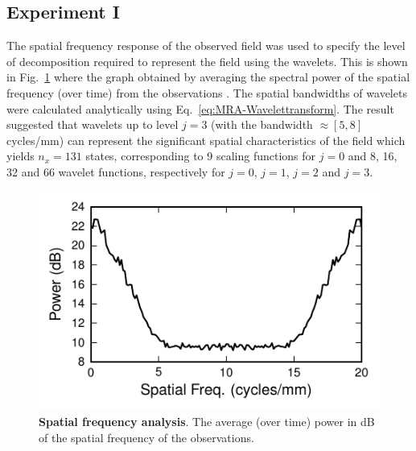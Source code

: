 \documentclass[review,authoryear,3p]{elsarticle}
\begin{document}
\subsection{Experiment I}
The spatial frequency response of the observed field was used to specify the level of decomposition required to represent the field using the wavelets. This is shown in Fig.~\ref{fig:ObservationFrequencyResponce} where the graph obtained by averaging the spectral power of the spatial frequency (over time) from the observations \citep{Scerri2009}. The spatial bandwidths of wavelets were calculated analytically using Eq.~\eqref{eq:MRA-Wavelettransform}. The result suggested that wavelets up to level $j=3$ (with the bandwidth $\approx[5,8]$ cycles/mm) can represent the significant spatial characteristics of the field which yields $n_x = 131$ states, corresponding to 9 scaling functions for $j=0$ and 8, 16, 32 and 66 wavelet functions, respectively for $j=0$, $j=1$, $j=2$ and $j=3$. 
\begin{figure}[!t]
 	\centering
 		\includegraphics[scale=1]{./Graph/fig7.pdf}
 		\caption{{\bf Spatial frequency analysis}. The average (over time) power in dB of the spatial frequency of the observations.}  
\label{fig:ObservationFrequencyResponce} 
 \end{figure}
\end{document}
